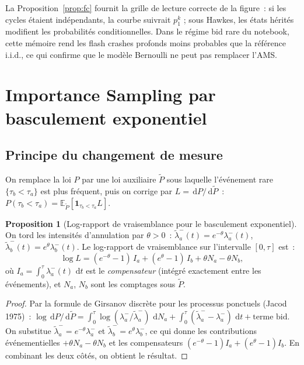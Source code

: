 \documentclass[11pt,a4paper]{article}
\theoremstyle{definition}
\newtheorem{proposition}{Proposition}[section]
\newcommand{\E}{\mathbb{E}}
\newcommand{\dif}{\,\mathrm{d}}
\newcommand{\la}{\lambda_a^-}
\newcommand{\lb}{\lambda_b^-}
\begin{document}
\begin{demonstration}
\begin{resultatpositif}[title={Non-indépendance des cycles Hawkes quantifiée}]
La Proposition~\ref{prop:fc} fournit la grille de lecture correcte de la
figure~: si les cycles étaient indépendants, la courbe suivrait $p_1^k$ ;
sous Hawkes, les états hérités modifient les probabilités conditionnelles.
Dans le régime bid rare du notebook, cette mémoire rend les flash crashes
profonds moins probables que la référence i.i.d., ce qui confirme que le
modèle Bernoulli ne peut pas remplacer l'AMS.
\end{resultatpositif}

\end{demonstration}

\section{Importance Sampling par basculement exponentiel}
\label{sec:is}

\subsection{Principe du changement de mesure}

On remplace la loi $P$ par une loi auxiliaire $\tilde P$ sous laquelle
l'événement rare $\{\tau_b<\tau_a\}$ est plus fréquent, puis on corrige par
$L=\dif P/\dif\tilde P$~:
$P(\tau_b<\tau_a) = \E_{\tilde P}[\mathbf{1}_{\tau_b<\tau_a}L]$.

\begin{proposition}[Log-rapport de vraisemblance pour le basculement exponentiel]
\label{prop:is_lr}
On tord les intensités d'annulation par $\theta>0$~:
$\tilde\la(t)=e^{-\theta}\la(t)$, $\tilde\lb(t)=e^\theta\lb(t)$.
Le log-rapport de vraisemblance sur l'intervalle $[0,\tau]$ est~:
\[
  \log L
  = (e^{-\theta}-1)\,I_a + (e^\theta-1)\,I_b + \theta N_a - \theta N_b,
\]
où $I_a=\int_0^\tau\la(t)\,\dif t$ est le \emph{compensateur} (intégré
exactement entre les événements), et $N_a$, $N_b$ sont les comptages sous $\tilde P$.
\end{proposition}

\begin{proof}
Par la formule de Girsanov discrète pour les processus ponctuels (Jacod 1975)~:
$\log\dif P/\dif\tilde P = \int_0^\tau\log(\la/\tilde\la)\,\dif N_a +
\int_0^\tau(\tilde\la-\la)\,\dif t + \text{terme bid}$.
On substitue $\tilde\la=e^{-\theta}\la$ et $\tilde\lb=e^\theta\lb$, ce qui donne
les contributions événementielles $+\theta N_a-\theta N_b$ et les compensateurs
$(e^{-\theta}-1)I_a+(e^\theta-1)I_b$.
En combinant les deux côtés, on obtient le résultat.
\end{proof}
\end{document}
